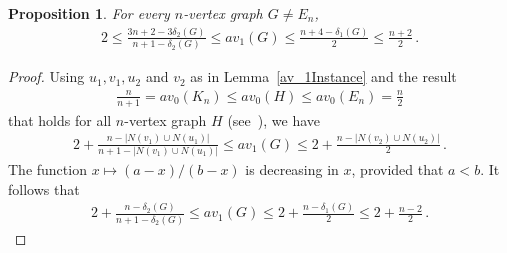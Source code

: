 \documentclass[a4paper,12pt]{amsart}
\newtheorem{proposition}[lemma]{Proposition}
\newtheorem{corollary}[lemma]{Corollary}
\theoremstyle{remark}
\begin{document}
\begin{proposition}\label{prop:delta}
For every $n$-vertex graph $G\neq E_n$, 
\begin{align*}
2\leq \frac{3n+2-3\delta_2(G)}{n+1-\delta_2(G)} \leq av_1(G) \leq \frac{n+4- \delta_1(G)}{2} \leq \frac{n+ 2}{2}\,.
\end{align*}
\end{proposition}
 
\begin{proof}
Using $u_1,v_1,u_2$ and $v_2$ as in Lemma~\ref{av_1Instance} and the result 
\begin{align*}
\frac{n}{n+1}=av_0(K_n)\leq av_0(H)\leq av_0(E_n)=\frac{n}{2}
\end{align*}
that holds for all $n$-vertex graph $H$ (see~\cite{andriantiana2018}), we have
\begin{align*}
2+ \frac{n-|N(v_1) \cup N(u_1)| }{n+1-|N(v_1) \cup N(u_1)| } \leq av_1(G) \leq 2+\frac{n-|N(v_2) \cup N(u_2)| }{2}\,.
\end{align*}
The function $x \mapsto (a-x)/(b-x)$ is decreasing in $x$, provided that $a<b$. It follows that
\begin{align*}
2+ \frac{n-\delta_2(G)}{n+1-\delta_2(G)} \leq av_1(G) \leq 2+\frac{n- \delta_1(G)}{2} \leq 2+\frac{n- 2}{2}\,.
\end{align*}
\end{proof}


 
\end{document}
